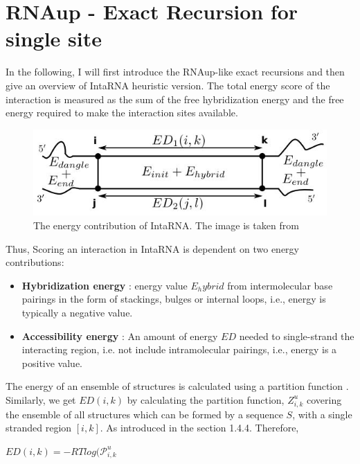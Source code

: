\documentclass[twoside,a4paper]{report}
\begin{document}
	\section{RNAup - Exact Recursion for single site}
	
	In the following, I will first introduce the RNAup-like exact recursions \citep{muckstein2006thermodynamics} and then give an overview of IntaRNA heuristic version. The total energy score of the interaction is measured as the sum of the free hybridization energy and the free energy required to make the interaction sites available.\\
	
		\begin{figure}[tb]
		\includegraphics[width=0.6\linewidth]{inta}
		\centering
		\caption{ The energy contribution of IntaRNA. The image is taken from \citep{gelhausen2018constrained} } 
		\label{fig:inta}
	\end{figure}
	
	Thus, Scoring an interaction in IntaRNA is dependent on two energy contributions:\\
	
	\begin{itemize}
		\item \textbf{Hybridization energy} : energy value $E_hybrid$ from intermolecular base pairings in the form of stackings, bulges or internal loops, i.e., energy is typically a negative value. 
		\item \textbf{Accessibility energy} : An amount of energy  $ED $ needed to single-strand the interacting region, i.e. not include intramolecular pairings, i.e., energy is a positive value. 
	\end{itemize}
	
	
	The energy of an ensemble of structures is calculated using a partition function \citep{mccaskill1990equilibrium}. Similarly, we get $ED(i,k)$ by calculating the partition function, ${Z}_{i,k}^{u}$ covering the ensemble of all structures which can be formed by a sequence $S$, with a single stranded region $[i,k]$. As introduced in the section 1.4.4. Therefore,
	
		\begin{center}
		
		$ED(i,k) = - RTlog(\mathcal{P}_{i,k}^{u}$
		
	\end{center}
	
\end{document}
